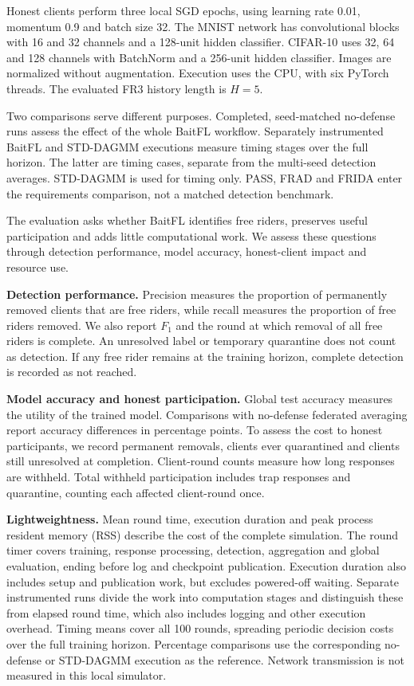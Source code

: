 \documentclass[journal]{IEEEtran}
\makeatletter
\renewcommand{\subsection}{\@startsection{subsection}{2}{\z@}{1.5ex}{0.7ex}{\normalfont\normalsize\itshape}}
\makeatother
\begin{document}
Honest clients perform three local SGD epochs, using learning rate 0.01,
momentum 0.9 and batch size 32. The MNIST network has convolutional blocks
with 16 and 32 channels and a 128-unit hidden classifier. CIFAR-10 uses
32, 64 and 128 channels with BatchNorm and a 256-unit hidden classifier.
Images are normalized without augmentation. Execution uses the CPU, with
six PyTorch threads. The evaluated FR3 history length is $H=5$.

Two comparisons serve different purposes. Completed, seed-matched
no-defense runs assess the effect of the whole BaitFL workflow.
Separately instrumented BaitFL and STD-DAGMM executions measure timing
stages over the full horizon. The latter are timing cases, separate from
the multi-seed detection averages.
STD-DAGMM is used for timing only. PASS, FRAD and FRIDA enter the
requirements comparison, not a matched detection benchmark.


\subsection{Evaluation Metrics}
The evaluation asks whether BaitFL identifies free riders, preserves
useful participation and adds little computational work. We assess these
questions through detection performance, model accuracy, honest-client
impact and resource use.

\textbf{Detection performance.} Precision measures the proportion of
permanently removed clients that are free riders, while recall measures
the proportion of free riders removed. We also report $F_1$ and the round at which removal
of all free riders is complete. An unresolved label or temporary quarantine
does not count as detection. If any free rider remains at the training
horizon, complete detection is recorded as not reached.

\textbf{Model accuracy and honest participation.} Global test accuracy
measures the utility of the trained model. Comparisons with no-defense
federated averaging report accuracy differences in percentage points.
To assess the cost to honest participants, we record permanent removals,
clients ever quarantined and clients still unresolved at completion.
Client-round counts measure how long responses are withheld. Total
withheld participation includes trap responses and quarantine, counting
each affected client-round once.

\textbf{Lightweightness.} Mean round time, execution duration and peak
process resident memory (RSS) describe the cost of the complete simulation.
The round timer covers training, response processing, detection,
aggregation and global evaluation, ending before log and checkpoint
publication. Execution duration also includes setup and publication work,
but excludes powered-off waiting. Separate instrumented runs divide the
work into computation stages and distinguish these from elapsed round
time, which also includes logging and other execution overhead. Timing means
cover all 100 rounds, spreading periodic decision costs over the full
training horizon. Percentage comparisons use the corresponding
no-defense or STD-DAGMM execution as the reference. Network transmission
is not measured in this local simulator.
\end{document}
